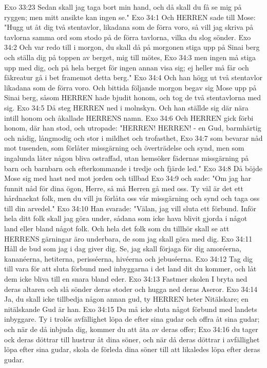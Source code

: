 Exo 33:23  Sedan skall jag taga bort min hand, och då skall du få se mig på ryggen; men mitt ansikte kan ingen se."
Exo 34:1  Och HERREN sade till Mose: "Hugg ut åt dig två stentavlor, likadana som de förra voro, så vill jag skriva på tavlorna samma ord som stodo på de förra tavlorna, vilka du slog sönder.
Exo 34:2  Och var redo till i morgon, du skall då på morgonen stiga upp på Sinai berg och ställa dig på toppen av berget, mig till mötes,
Exo 34:3  men ingen må stiga upp med dig, och på hela berget för ingen annan visa sig; ej heller må får och fäkreatur gå i bet framemot detta berg."
Exo 34:4  Och han högg ut två stentavlor likadana som de förra voro. Och bittida följande morgon begav sig Mose upp på Sinai berg, såsom HERREN hade bjudit honom, och tog de två stentavlorna med sig.
Exo 34:5  Då steg HERREN ned i molnskyn. Och han ställde sig där nära intill honom och åkallade HERRENS namn.
Exo 34:6  Och HERREN gick förbi honom, där han stod, och utropade: "HERREN! HERREN! - en Gud, barmhärtig och nådig, långmodig och stor i mildhet och trofasthet,
Exo 34:7  som bevarar nåd mot tusenden, som förlåter missgärning och överträdelse och synd, men som ingalunda låter någon bliva ostraffad, utan hemsöker fädernas missgärning på barn och barnbarn och efterkommande i tredje och fjärde led."
Exo 34:8  Då böjde Mose sig med hast ned mot jorden och tillbad
Exo 34:9  och sade: "Om jag har funnit nåd för dina ögon, Herre, så må Herren gå med oss. Ty väl är det ett hårdnackat folk, men du vill ju förlåta oss vår missgärning och synd och taga oss till din arvedel."
Exo 34:10  Han svarade: "Välan, jag vill sluta ett förbund. Inför hela ditt folk skall jag göra under, sådana som icke hava blivit gjorda i något land eller bland något folk. Och hela det folk som du tillhör skall se att HERRENS gärningar äro underbara, de som jag skall göra med dig.
Exo 34:11  Håll de bud som jag i dag giver dig. Se, jag skall förjaga för dig amoréerna, kananéerna, hetiterna, perisséerna, hivéerna och jebuséerna.
Exo 34:12  Tag dig till vara för att sluta förbund med inbyggarna i det land dit du kommer, och låt dem icke bliva till en snara bland eder.
Exo 34:13  Fastmer skolen I bryta ned deras altaren och slå sönder deras stoder och hugga ned deras Aseror.
Exo 34:14  Ja, du skall icke tillbedja någon annan gud, ty HERREN heter Nitälskare; en nitälskande Gud är han.
Exo 34:15  Du må icke sluta något förbund med landets inbyggare. Ty i trolös avfällighet löpa de efter sina gudar och offra åt sina gudar; och när de då inbjuda dig, kommer du att äta av deras offer;
Exo 34:16  du tager ock deras döttrar till hustrur åt dina söner, och när då deras döttrar i avfällighet löpa efter sina gudar, skola de förleda dina söner till att likaledes löpa efter deras gudar.
